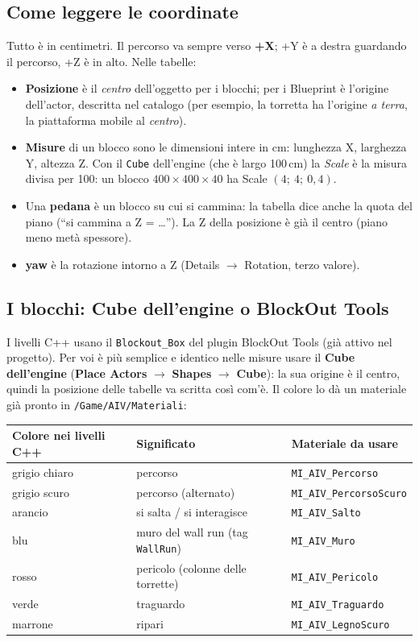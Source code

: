 \documentclass[a4paper,10pt]{article}
\newcommand{\nodo}[1]{\textsf{\textbf{#1}}}
\newcommand{\var}[1]{\texttt{#1}}
\begin{document}
\subsection{Come leggere le coordinate}

Tutto è in centimetri. Il percorso va sempre verso \textbf{+X}; +Y è a destra guardando il percorso, +Z è in alto. Nelle tabelle:
\begin{itemize}
  \item \textbf{Posizione} è il \emph{centro} dell'oggetto per i blocchi; per i Blueprint è l'origine dell'actor, descritta nel catalogo (per esempio, la torretta ha l'origine \emph{a terra}, la piattaforma mobile al \emph{centro}).
  \item \textbf{Misure} di un blocco sono le dimensioni intere in cm: lunghezza X, larghezza Y, altezza Z. Con il \var{Cube} dell'engine (che è largo 100\,cm) la \emph{Scale} è la misura divisa per 100: un blocco $400 \times 400 \times 40$ ha Scale $(4;\ 4;\ 0{,}4)$.
  \item Una \textbf{pedana} è un blocco su cui si cammina: la tabella dice anche la quota del piano (``si cammina a Z = \dots''). La Z della posizione è già il centro (piano meno metà spessore).
  \item \textbf{yaw} è la rotazione intorno a Z (Details $\rightarrow$ Rotation, terzo valore).
\end{itemize}

\subsection{I blocchi: Cube dell'engine o BlockOut Tools}

I livelli C++ usano il \var{Blockout\_Box} del plugin BlockOut Tools (già attivo nel progetto). Per voi è più semplice e identico nelle misure usare il \textbf{Cube dell'engine} (\nodo{Place Actors} $\rightarrow$ \nodo{Shapes} $\rightarrow$ \nodo{Cube}): la sua origine è il centro, quindi la posizione delle tabelle va scritta così com'è. Il colore lo dà un materiale già pronto in \texttt{/Game/AIV/Materiali}:

\begin{center}
\begin{tabular}{lll}
\toprule
Colore nei livelli C++ & Significato & Materiale da usare \\
\midrule
grigio chiaro & percorso & \var{MI\_AIV\_Percorso} \\
grigio scuro & percorso (alternato) & \var{MI\_AIV\_PercorsoScuro} \\
arancio & si salta / si interagisce & \var{MI\_AIV\_Salto} \\
blu & muro del wall run (tag \var{WallRun}) & \var{MI\_AIV\_Muro} \\
rosso & pericolo (colonne delle torrette) & \var{MI\_AIV\_Pericolo} \\
verde & traguardo & \var{MI\_AIV\_Traguardo} \\
marrone & ripari & \var{MI\_AIV\_LegnoScuro} \\
\bottomrule
\end{tabular}
\end{center}
\end{document}
